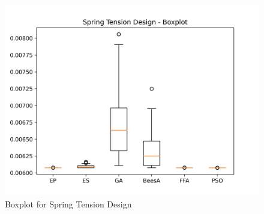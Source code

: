 \begin{figure}[H]
\centering
\caption{Boxplot for Spring Tension Design}
\label{fig:spring_tension_design_boxplot}
\includegraphics[scale=0.5]{images/spring_problem_boxplot.png}
\end{figure}
